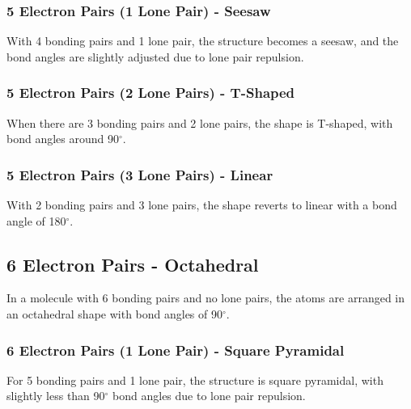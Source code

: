 \documentclass{report}
\begin{document}
\subsubsection{5 Electron Pairs (1 Lone Pair) - Seesaw}
With 4 bonding pairs and 1 lone pair, the structure becomes a seesaw, and the bond angles are slightly adjusted due to lone pair repulsion.
\begin{center}
\end{center}

\subsubsection{5 Electron Pairs (2 Lone Pairs) - T-Shaped}
When there are 3 bonding pairs and 2 lone pairs, the shape is T-shaped, with bond angles around 90$^\circ$.
\begin{center}
\end{center}

\subsubsection{5 Electron Pairs (3 Lone Pairs) - Linear}
With 2 bonding pairs and 3 lone pairs, the shape reverts to linear with a bond angle of 180$^\circ$.
\begin{center}
\end{center}

\subsection{6 Electron Pairs - Octahedral}
In a molecule with 6 bonding pairs and no lone pairs, the atoms are arranged in an octahedral shape with bond angles of 90$^\circ$.
\begin{center}
\end{center}

\subsubsection{6 Electron Pairs (1 Lone Pair) - Square Pyramidal}
For 5 bonding pairs and 1 lone pair, the structure is square pyramidal, with slightly less than 90$^\circ$ bond angles due to lone pair repulsion.
\begin{center}
\end{center}
\end{document}
